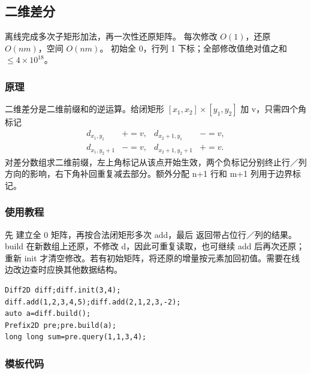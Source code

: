 \subsection{二维差分}
\label{other:difference-2d}
\AlgorithmInfo
    {离线完成多次子矩形加法，再一次性还原矩阵。}
    {每次修改 $O(1)$，还原 $O(nm)$，空间 $O(nm)$。}
    {初始全 0，行列 1 下标；全部修改值绝对值之和 $\le4\times10^{18}$。}
\subsubsection*{原理}
二维差分是二维前缀和的逆运算。给闭矩形 $[x_1,x_2]\times[y_1,y_2]$ 加 v，只需四个角标记
\[
 \begin{aligned}
 d_{x_1,y_1}&\mathrel{+}=v,&d_{x_2+1,y_1}&\mathrel{-}=v,\\
 d_{x_1,y_2+1}&\mathrel{-}=v,&d_{x_2+1,y_2+1}&\mathrel{+}=v.
 \end{aligned}
\]
对差分数组求二维前缀，左上角标记从该点开始生效，两个负标记分别终止行／列方向的影响，右下角补回重复减去部分。额外分配 n+1 行和 m+1 列用于边界标记。
\subsubsection*{使用教程}
先  建立全 0 矩阵，再按合法闭矩形多次 add，最后  返回带占位行／列的结果。build 在新数组上还原，不修改 d，因此可重复读取，也可继续 add 后再次还原；重新 init 才清空修改。若有初始矩阵，将还原的增量按元素加回初值。需要在线边改边查时应换其他数据结构。
\begin{lstlisting}[style=mtycpp,numbers=none]
Diff2D diff;diff.init(3,4);
diff.add(1,2,3,4,5);diff.add(2,1,2,3,-2);
auto a=diff.build();
Prefix2D pre;pre.build(a);
long long sum=pre.query(1,1,3,4);
\end{lstlisting}
\subsubsection*{模板代码}
